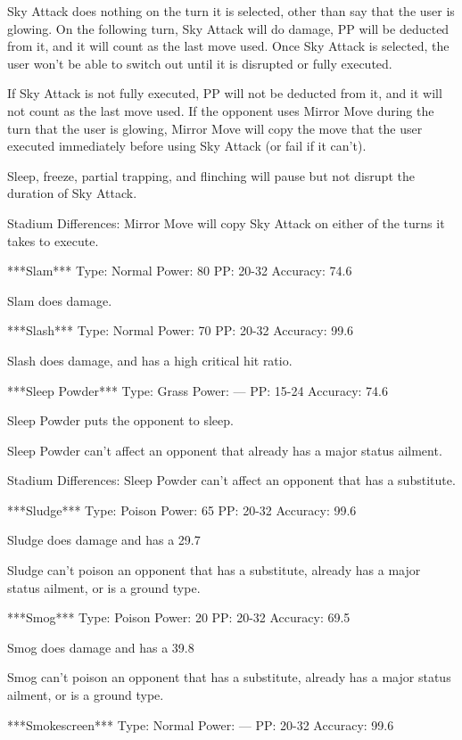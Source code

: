 \documentclass[reprint, aps, prl, paper=A4]{revtex4-1}
\begin{document}
Sky Attack does nothing on the turn it is selected, other than say that the user is glowing. On
the following turn, Sky Attack will do damage, PP will be deducted from it, and it will count
as the last move used. Once Sky Attack is selected, the user won't be able to switch out until
it is disrupted or fully executed.

If Sky Attack is not fully executed, PP will not be deducted from it, and it will not count as
the last move used. If the opponent uses Mirror Move during the turn that the user is glowing,
Mirror Move will copy the move that the user executed immediately before using Sky Attack (or
fail if it can't).

Sleep, freeze, partial trapping, and flinching will pause but not disrupt the duration of Sky
Attack.

Stadium Differences:
Mirror Move will copy Sky Attack on either of the turns it takes to execute.


***Slam***
Type: Normal
Power: 80
PP: 20-32
Accuracy: 74.6%

Slam does damage.


***Slash***
Type: Normal
Power: 70
PP: 20-32
Accuracy: 99.6%

Slash does damage, and has a high critical hit ratio.


***Sleep Powder***
Type: Grass
Power: ---
PP: 15-24
Accuracy: 74.6%

Sleep Powder puts the opponent to sleep.

Sleep Powder can't affect an opponent that already has a major status ailment.

Stadium Differences:
Sleep Powder can't affect an opponent that has a substitute.


***Sludge***
Type: Poison
Power: 65
PP: 20-32
Accuracy: 99.6%

Sludge does damage and has a 29.7%

Sludge can't poison an opponent that has a substitute, already has a major status ailment, or
is a ground type.


***Smog***
Type: Poison
Power: 20
PP: 20-32
Accuracy: 69.5%

Smog does damage and has a 39.8%

Smog can't poison an opponent that has a substitute, already has a major status ailment, or is
a ground type.


***Smokescreen***
Type: Normal
Power: ---
PP: 20-32
Accuracy: 99.6%
\end{document}
